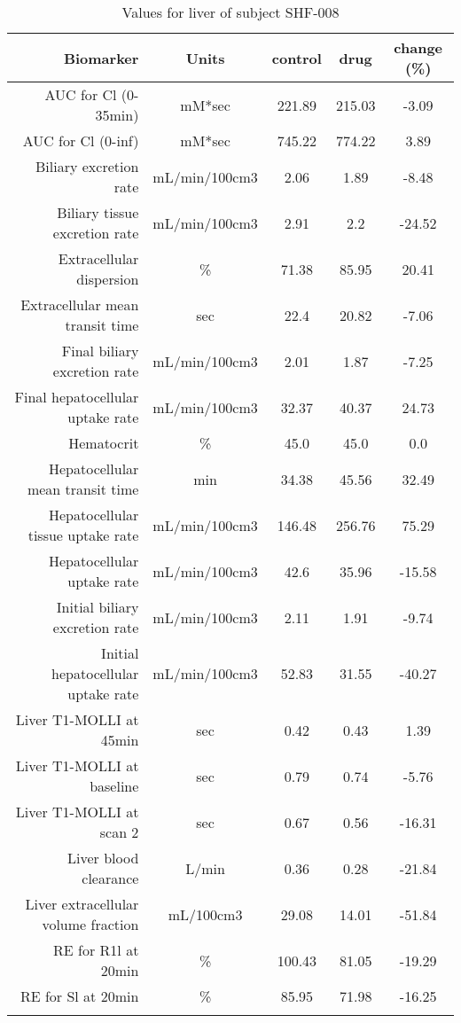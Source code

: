 \documentclass{epflreport}%
\begin{document}
%
\clearpage%
\begin{longtable}{rcccc}%
\hline%
Biomarker&Units&control&drug&change (\%)\\%
\hline%
AUC for Cl (0{-}35min)&mM*sec&221.89&215.03&{-}3.09\\%
AUC for Cl (0{-}inf)&mM*sec&745.22&774.22&3.89\\%
Biliary excretion rate&mL/min/100cm3&2.06&1.89&{-}8.48\\%
Biliary tissue excretion rate&mL/min/100cm3&2.91&2.2&{-}24.52\\%
Extracellular dispersion&\%&71.38&85.95&20.41\\%
Extracellular mean transit time&sec&22.4&20.82&{-}7.06\\%
Final biliary excretion rate&mL/min/100cm3&2.01&1.87&{-}7.25\\%
Final hepatocellular uptake rate&mL/min/100cm3&32.37&40.37&24.73\\%
Hematocrit&\%&45.0&45.0&0.0\\%
Hepatocellular mean transit time&min&34.38&45.56&32.49\\%
Hepatocellular tissue uptake rate&mL/min/100cm3&146.48&256.76&75.29\\%
Hepatocellular uptake rate&mL/min/100cm3&42.6&35.96&{-}15.58\\%
Initial biliary excretion rate&mL/min/100cm3&2.11&1.91&{-}9.74\\%
Initial hepatocellular uptake rate&mL/min/100cm3&52.83&31.55&{-}40.27\\%
Liver T1{-}MOLLI at 45min&sec&0.42&0.43&1.39\\%
Liver T1{-}MOLLI at baseline&sec&0.79&0.74&{-}5.76\\%
Liver T1{-}MOLLI at scan 2&sec&0.67&0.56&{-}16.31\\%
Liver blood clearance&L/min&0.36&0.28&{-}21.84\\%
Liver extracellular volume fraction&mL/100cm3&29.08&14.01&{-}51.84\\%
RE for R1l at 20min&\%&100.43&81.05&{-}19.29\\%
RE for Sl at 20min&\%&85.95&71.98&{-}16.25\\%
\hline%
\caption{Values for liver of subject SHF-008} \\%
\end{longtable}%
\end{document}
